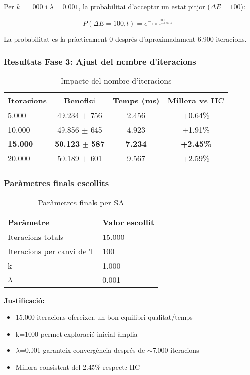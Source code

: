 Per $k=1000$ i $\lambda=0.001$, la probabilitat d'acceptar un estat pitjor ($\Delta E = 100$):

\begin{equation}
P(\Delta E = 100, t) = e^{-\frac{100}{1000 \cdot e^{-0.001 \cdot t}}}
\end{equation}

La probabilitat es fa pràcticament 0 després d'aproximadament 6.900 iteracions.

\subsubsection{Resultats Fase 3: Ajust del nombre d'iteracions}

\begin{table}[H]
\centering
\begin{tabular}{@{}lccc@{}}
\toprule
\textbf{Iteracions} & \textbf{Benefici} & \textbf{Temps (ms)} & \textbf{Millora vs HC} \\
\midrule
5.000 & 49.234 $\pm$ 756 & 2.456 & +0.64\% \\
10.000 & 49.856 $\pm$ 645 & 4.923 & +1.91\% \\
\textbf{15.000} & \textbf{50.123} $\pm$ \textbf{587} & \textbf{7.234} & \textbf{+2.45\%} \\
20.000 & 50.189 $\pm$ 601 & 9.567 & +2.59\% \\
\bottomrule
\end{tabular}
\caption{Impacte del nombre d'iteracions}
\label{tab:exp3-iteracions}
\end{table}

\subsubsection{Paràmetres finals escollits}

\begin{table}[H]
\centering
\begin{tabular}{@{}ll@{}}
\toprule
\textbf{Paràmetre} & \textbf{Valor escollit} \\
\midrule
Iteracions totals & 15.000 \\
Iteracions per canvi de T & 100 \\
k & 1.000 \\
$\lambda$ & 0.001 \\
\bottomrule
\end{tabular}
\caption{Paràmetres finals per SA}
\label{tab:exp3-final}
\end{table}

\textbf{Justificació:}
\begin{itemize}
    \item 15.000 iteracions ofereixen un bon equilibri qualitat/temps
    \item k=1000 permet exploració inicial àmplia
    \item $\lambda$=0.001 garanteix convergència després de $\sim$7.000 iteracions
    \item Millora consistent del 2.45\% respecte HC
\end{itemize}
